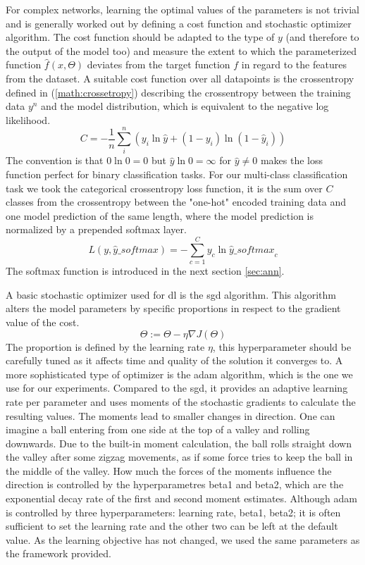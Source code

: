 For complex networks, learning the optimal values of the parameters is not trivial and is generally worked out by defining a cost function and stochastic optimizer algorithm.
The cost function should be adapted to the type of $y$ (and therefore to the output of the model too) and measure the extent to which the parameterized function $\hat{f}(x, \Theta)$ deviates from the target function $f$ in regard to the features from the dataset.
A suitable cost function over all datapoints is the crossentropy defined in (\ref{math:crossetropy}) describing the crossentropy between the training data $y^n$ and the model distribution, which is equivalent to the negative log likelihood.
\begin{equation}
    C=-\frac{1}{n}\sum_i^n\left(y_i\ln{\hat{y}}+(1-y_i)\ln{(1-\hat{y}_i)}\right) \label{math:crossetropy}
\end{equation}
The convention is that $0\ln{0} = 0$ but $\hat{y}\ln{0} = \infty$ for $\hat{y} \neq 0$ makes the loss function perfect for binary classification tasks.
For our multi-class classification task we took the categorical crossentropy loss function, it is the sum over $C$ classes from the crossentropy between the "one-hot" encoded training data and one model prediction of the same length, where the model prediction is normalized by a prepended softmax layer.
$$
L(y,\hat{y}\mathit{\_softmax}) = -\sum_{c=1}^Cy_c\ln{\hat{y}\mathit{\_softmax}_c}
$$
The softmax function is introduced in the next section \ref{sec:ann}.

A basic stochastic optimizer used for \gls{dl} is the \gls{sgd} algorithm. This algorithm alters the model parameters by specific proportions in respect to the gradient value of the cost.
$$
\Theta := \Theta - \eta\nabla J(\Theta)
$$
The proportion is defined by the learning rate $\eta$, this hyperparameter should be carefully tuned as it affects time and quality of the solution it converges to. A more sophisticated type of optimizer is the \gls{adam} algorithm, which is the one we use for our experiments.
Compared to the \gls{sgd}, it provides an adaptive learning rate per parameter and uses moments of the stochastic gradients to calculate the resulting values. The moments lead to smaller changes in direction.
One can imagine a ball entering from one side at the top of a valley and rolling downwards.
Due to the built-in moment calculation, the ball rolls straight down the valley after some zigzag movements, as if some force tries to keep the ball in the middle of the valley.
How much the forces of the moments influence the direction is controlled by the hyperparametres beta1 and beta2, which are the exponential decay rate of the first and second moment estimates.
Although \gls{adam} is controlled by three hyperparameters: learning rate, beta1, beta2; it is often sufficient to set the learning rate and the other two can be left at the default value.
As the learning objective has not changed, we used the same parameters as the framework provided.


